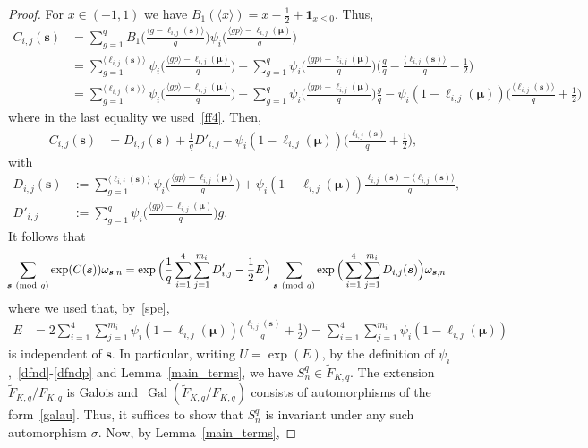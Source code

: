 \documentclass[11pt]{amsart}
\newcommand{\ang}[1]{\langle#1\rangle}
\renewcommand{\mod}[1]{~\pr{\textnormal{mod}~#1}}
\theoremstyle{definition}
\newcommand{\pr}[1]{\mathchoice{\left( #1\right)}{(#1)}{(#1)}{(#1)}}
\newcommand{\Gal}{\operatorname*{Gal}}
\newcommand{\bs}{\boldsymbol }
\newcommand{\1}{{\mathbf 1}}
\let\originalleft\left
\let\originalright\right
\renewcommand{\left}{\mathopen{}\mathclose\bgroup\originalleft}
\renewcommand{\right}{\aftergroup\egroup\originalright}
\numberwithin{equation}{section}
\begin{document}
\begin{proof}
  For $x\in(-1,1)$ we have $B_1(\ang{x})=x-\frac12+\1_{x\leq 0}$. Thus,
  \begin{align*}
    C_{i,j}(\bs s)&
    =\sum_{g=1}^{q}B_1\Big(\frac{\ang{g- \ell_{i,j}(\bs s)}}q\Big) \psi_i\Big(\frac{\ang{gp } -\ell_{i,j}(\bs\mu)}q\Big)\\
    &=\sum_{g=1}^{\ang{\ell_{i,j}(\bs s)}} \psi_i\Big(\frac{\ang{gp } -\ell_{i,j}(\bs\mu)}q\Big)+\sum_{g=1}^{q} \psi_i\Big(\frac{\ang{gp } -\ell_{i,j}(\bs\mu)}q\Big)\Big(\frac{ g}q-\frac{ \ang{\ell_{i,j}(\bs s)}}q-\frac12\Big)\\
    &=\sum_{g=1}^{\ang{\ell_{i,j}(\bs s)}} \psi_i\Big(\frac{\ang{gp } -\ell_{i,j}(\bs\mu)}q\Big)+\sum_{g=1}^{q} \psi_i\Big(\frac{\ang{gp } -\ell_{i,j}(\bs\mu)}q\Big)\frac{ g}q- \psi_i(1 -\ell_{i,j}(\bs\mu))\Big(\frac{ \ang{\ell_{i,j}(\bs s)}}q+\frac12\Big)
  \end{align*}
  where in the last equality we used~\eqref{ff4}. Then,
  \begin{align}\label{cspl}
    C_{i,j}(\bs s)&=D_{i,j}(\bs s)+\frac1q{D'_{i,j}}- \psi_i(1 -\ell_{i,j}(\bs\mu))\Big(\frac{  \ell_{i,j}(\bs s)}q+\frac12\Big),
  \end{align}
  with
  \begin{align}
    D_{i,j}(\bs s)&:=\sum_{g=1}^{\ang{\ell_{i,j}(\bs s)}} \psi_i\Big(\frac{\ang{gp } -\ell_{i,j}(\bs\mu)}q\Big) + \psi_i(1 -\ell_{i,j}(\bs\mu))\frac{\ell_{i,j}(\bs s)- \ang{\ell_{i,j}(\bs s)}}q,\label{dfnd}\\
    D'_{i,j}&:=\sum_{g=1}^{q} \psi_i\Big(\frac{\ang{gp } -\ell_{i,j}(\bs\mu)}q\Big)g.\label{dfndp}
  \end{align} 
  It follows that 
  \begin{align}\label{seq}
    \!\sum_{\bs s \mod q}\exp(C(\bs s))\omega_{\bs s,n}&=\exp\Big(\frac1q\sum_{i=1}^4\sum_{j=1}^{m_i}D'_{i,j}-\frac12E\Big)\sum_{\bs s\mod q}\exp\Big(\sum_{i=1}^4\sum_{j=1}^{m_i}D_{i,j}(\bs s)\Big)\omega_{\bs s,n}
  \end{align}
  where we used that, by~\eqref{spe},
  \begin{align*}
    E&=2 \sum_{i=1}^4\sum_{j=1}^{m_i} \psi_i(1-\ell_{i,j}(\bs\mu))\Big(\frac{  \ell_{i,j}(\bs s)}q+\frac12\Big)=\sum_{i=1}^4\sum_{j=1}^{m_i} \psi_i(1-\ell_{i,j}(\bs\mu))
  \end{align*}
  is independent of $\bs s$. In particular, writing $U=\exp(E)$, by the definition of $\psi_i$,~\eqref{dfnd}-\eqref{dfndp} and Lemma~\ref{main_terms}, we have $S_n^q\in {\tilde F}_{K, q}$.
  The extension ${\tilde F}_{K, q} / F_{K, q}$ is Galois and~$\Gal({\tilde F}_{K, q} / F_{K, q})$ consists of automorphisms of the form~\eqref{galau}. Thus, it suffices to show that $S_n^q$ is invariant under any such automorphism $\sigma$. Now, by Lemma~\ref{main_terms},

\end{proof}
\end{document}
